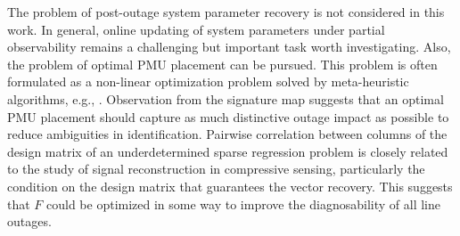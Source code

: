 The problem of post-outage system parameter recovery is not considered in this work. In general, online updating of system parameters under partial observability remains a challenging but important task worth investigating. Also, the problem of optimal PMU placement can be pursued.  This problem is often formulated as a non-linear optimization problem solved by meta-heuristic algorithms, e.g., \cite{yang2020optimal}. Observation from the signature map suggests that an optimal PMU placement should capture as much distinctive outage impact as possible to reduce ambiguities in identification. Pairwise correlation between columns of the design matrix of an underdetermined sparse regression problem is closely related to the study of signal reconstruction in compressive sensing, particularly the condition on the design matrix that guarantees the vector recovery. This suggests that $F$ could be optimized in some way to improve the diagnosability of all line outages.